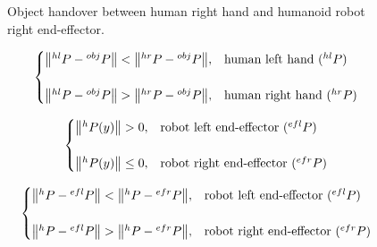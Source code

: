 \documentclass[a4paper, 12pt, oneside]{Thesis}  %
\begin{document}
\begin{figure}[hpt]
	\caption{Object handover between human right hand and humanoid robot right end-effector.}
	\label{fig:hr-to-rr}
\end{figure}


\begin{equation}\label{human obj dist}
\centering
\begin{cases}
	\norm{{}^{hl}{P} - {}^{obj}{P}} < \norm{{}^{hr}{P} - {}^{obj}{P}}, & \text{human left hand (${}^{hl}{P}$)}  \\
	\\
	\norm{{}^{hl}{P} - {}^{obj}{P}} > \norm{{}^{hr}{P} - {}^{obj}{P}}, & \text{human right hand (${}^{hr}{P}$)}
\end{cases}         
\end{equation}


\begin{equation}\label{human hand dir}
\centering
\begin{cases}
\norm{{}^{h}{P}(y)} > 0,  &  \text{robot left end-effector (${}^{efl}{P}$)} \\
\\
\norm{{}^{h}{P}(y)} \leq 0,  &  \text{robot right end-effector (${}^{efr}{P}$)}
\end{cases}         
\end{equation}

\begin{equation}\label{robot obj dis}
\centering
\begin{cases}
\norm{{}^{h}{P} - {}^{efl}{P}} < \norm{{}^{h}{P} - {}^{efr}{P}}, &  \text{robot left end-effector (${}^{efl}{P}$)} \\
\\
\norm{{}^{h}{P} - {}^{efl}{P}} > \norm{{}^{h}{P} - {}^{efr}{P}}, &  \text{robot right end-effector (${}^{efr}{P}$)}
\end{cases}
\end{equation}
\end{document}
